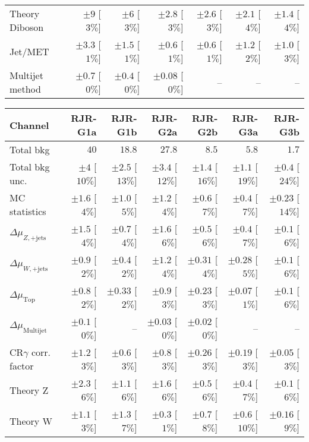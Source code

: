 \begin{table}[tbp]
\begin{center}
\begin{tabular}{|lrrrrrr|}
Theory Diboson  &  $\pm 9$ [$3\%$]  &  $\pm 6$ [$3\%$]  &  $\pm 2.8$ [$3\%$]  &  $\pm 2.6$ [$3\%$]  &  $\pm 2.1$ [$4\%$]  &  $\pm 1.4$ [$4\%$] \\
Jet/MET   &  $\pm 3.3$ [$1\%$]  &  $\pm 1.5$ [$1\%$]  &  $\pm 0.6$ [$1\%$]  &  $\pm 0.6$ [$1\%$]  &  $\pm 1.2$ [$2\%$]  &  $\pm 1.0$ [$3\%$] \\
Multijet method  &  $\pm 0.7$ [$0\%$]  &  $\pm 0.4$ [$0\%$]  &  $\pm 0.08$ [$0\%$]  &   --    &   --    &   --   \\
\hline
\end{tabular}

\begin{tabular}{|lrrrrrr|}
\hline
Channel  &  \textbf{ RJR-G1a } & \textbf{ RJR-G1b } & \textbf{ RJR-G2a } & \textbf{ RJR-G2b } & \textbf{ RJR-G3a } & \textbf{ RJR-G3b }  \\ \hline
Total bkg  &  $40$  &  $18.8$  &  $27.8$  &  $8.5$  &  $5.8$  &  $1.7$ \\
Total bkg unc.  &  $\pm 4$  [$10\%$]  &  $\pm 2.5$  [$13\%$]  &  $\pm 3.4$  [$12\%$]  &  $\pm 1.4$  [$16\%$]  &  $\pm 1.1$  [$19\%$]  &  $\pm 0.4$  [$24\%$] \\
\hline
MC statistics  &  $\pm 1.6$ [$4\%$]  &  $\pm 1.0$ [$5\%$]  &  $\pm 1.2$ [$4\%$]  &  $\pm 0.6$ [$7\%$]  &  $\pm 0.4$ [$7\%$]  &  $\pm 0.23$ [$14\%$] \\
$\Delta\mu_{Z,\mathrm{+jets}}$  &  $\pm 1.5$ [$4\%$]  &  $\pm 0.7$ [$4\%$]  &  $\pm 1.6$ [$6\%$]  &  $\pm 0.5$ [$6\%$]  &  $\pm 0.4$ [$7\%$]  &  $\pm 0.1$ [$6\%$] \\
$\Delta\mu_{W,\mathrm{+jets}}$  &  $\pm 0.9$ [$2\%$]  &  $\pm 0.4$ [$2\%$]  &  $\pm 1.2$ [$4\%$]  &  $\pm 0.31$ [$4\%$]  &  $\pm 0.28$ [$5\%$]  &  $\pm 0.1$ [$6\%$] \\
$\Delta\mu_{\mathrm{ Top}}$  &  $\pm 0.8$ [$2\%$]  &  $\pm 0.33$ [$2\%$]  &  $\pm 0.9$ [$3\%$]  &  $\pm 0.23$ [$3\%$]  &  $\pm 0.07$ [$1\%$]  &  $\pm 0.1$ [$6\%$] \\
$\Delta\mu_{\mathrm{ Multijet}}$  &  $\pm 0.1$ [$0\%$]  &  --  &  $\pm 0.03$ [$0\%$]  &  $\pm 0.02$ [$0\%$]  &   --    &   --   \\
CR$\gamma$ corr. factor  &  $\pm 1.2$ [$3\%$]  &  $\pm 0.6$ [$3\%$]  &  $\pm 0.8$ [$3\%$]  &  $\pm 0.26$ [$3\%$]  &  $\pm 0.19$ [$3\%$]  &  $\pm 0.05$ [$3\%$] \\
Theory Z  &  $\pm 2.3$ [$6\%$]  &  $\pm 1.1$ [$6\%$]  &  $\pm 1.6$ [$6\%$]  &  $\pm 0.5$ [$6\%$]  &  $\pm 0.4$ [$7\%$]  &  $\pm 0.1$ [$6\%$] \\
Theory W  &  $\pm 1.1$ [$3\%$]  &  $\pm 1.3$ [$7\%$]  &  $\pm 0.3$ [$1\%$]  &  $\pm 0.7$ [$8\%$]  &  $\pm 0.6$ [$10\%$]  &  $\pm 0.16$ [$9\%$] \\

\end{tabular}
\end{center}
\end{table}
